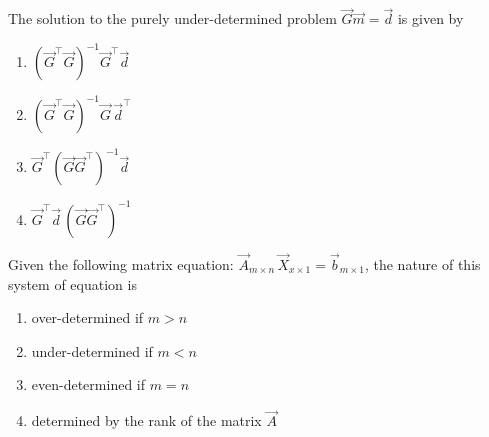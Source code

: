 \item The solution to the purely under-determined problem \(\vec{G}\vec{m}=\vec{d}\) is given by
\hfill{}

\begin{multicols}{1}
\begin{enumerate}
\item \((\vec{G}^{\top}\vec{G})^{-1}\vec{G}^{\top}\vec{d}\)
\item \((\vec{G}^{\top}\vec{G})^{-1}\vec{G}\,\vec{d}^{\top}\)
\item \(\vec{G}^{\top}(\vec{G}\vec{G}^{\top})^{-1}\vec{d}\)
\item \(\vec{G}^{\top}\vec{d}\,(\vec{G}\vec{G}^{\top})^{-1}\)
\end{enumerate}
\end{multicols}
\item Given the following matrix equation:
\(\vec{A}_{m\times n}\,\vec{X}_{x\times 1}=\vec{b}_{m\times 1}\), the nature of this system of equation is
\hfill{}
\begin{multicols}{2}
\begin{enumerate}
\item over-determined if \(m>n\)
\item under-determined if \(m<n\)
\item even-determined if \(m=n\)
\item determined by the rank of the matrix \(\vec{A}\)
\end{enumerate}
\end{multicols}
